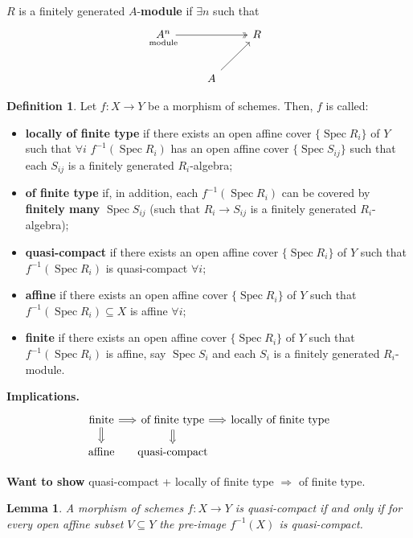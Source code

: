\documentclass[12pt]{article}
\DeclareMathOperator{\Spec}{Spec}
\newtheorem{lemma+}{Lemma}
\theoremstyle{definition}
\newtheorem*{definition}{Definition}
\begin{document}
$R$ is a finitely generated $A$-\textbf{module} if $\exists n$ such that
\[
\begin{tikzcd}
\underset{\mathclap{\text{module}}}{A^n}\arrow[rr,two heads]&&R\\
&A\arrow[ru]
\end{tikzcd}
\]

\begin{definition}
Let $f:X\rightarrow Y$ be a morphism of schemes. Then, $f$ is called:
\begin{itemize}
\item \textbf{locally of finite type} if there exists an open affine cover $\{\Spec R_i\}$ of $Y$ such that $\forall i$ $f^{-1}(\Spec R_i)$ has an open affine cover $\{\Spec S_{ij}\}$ such that each $S_{ij}$ is a finitely generated $R_i$-algebra;
\item \textbf{of finite type} if, in addition, each $f^{-1}(\Spec R_i)$ can be covered by \textbf{finitely many} $\Spec S_{ij}$ (such that $R_i\rightarrow S_{ij}$ is a finitely generated $R_i$-algebra);
\item \textbf{quasi-compact} if there exists an open affine cover $\{\Spec R_i\}$ of $Y$ such that $f^{-1}(\Spec R_i)$ is quasi-compact $\forall i$;
\item \textbf{affine} if there exists an open affine cover $\{\Spec R_i\}$ of $Y$ such that $f^{-1}(\Spec R_i)\subseteq X$ is affine $\forall i$;
\item \textbf{finite} if there exists an open affine cover $\{\Spec R_i\}$ of $Y$ such that $f^{-1}(\Spec R_i)$ is affine, say $\Spec S_i$ and each $S_i$ is a finitely generated $R_i$-module.
\end{itemize}
\end{definition}

\textbf{Implications.}
\[
\begin{tikzcd}[column sep=small]
\text{finite}\arrow[r,Rightarrow]\arrow[d,Rightarrow]&\text{of finite type}\arrow[r,Rightarrow]\arrow[d,Rightarrow]&\text{locally of finite type}\\[-0.2cm]
\text{affine}&\text{quasi-compact}
\end{tikzcd}
\]

\textbf{Want to show} quasi-compact + locally of finite type $\Longrightarrow$ of finite type.

\begin{lemma+}\label{preimage_qcompact}
A morphism of schemes $f:X\rightarrow Y$ is quasi-compact if and only if for every open affine subset $V\subseteq Y$ the pre-image $f^{-1}(X)$ is quasi-compact.
\end{lemma+}
\end{document}
